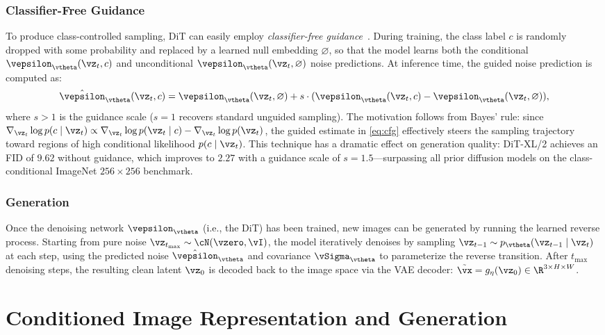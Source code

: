 \documentclass[../../book-main.tex]{subfiles}
\begin{document}
\subsubsection{Classifier-Free Guidance}
To produce class-controlled sampling, DiT can easily employ \textit{classifier-free guidance}~\citep{ho2022classifier}.
During training, the class label \(c\) is randomly dropped with some probability and replaced by a learned null embedding \(\varnothing\), so that the model learns both the conditional \(\vepsilon_{\vtheta}(\vz_t, c)\) and unconditional \(\vepsilon_{\vtheta}(\vz_t, \varnothing)\) noise predictions.
At inference time, the guided noise prediction is computed as:
\begin{equation}
    \hat{\vepsilon}_{\vtheta}(\vz_t, c) = \vepsilon_{\vtheta}(\vz_t, \varnothing) + s \cdot (\vepsilon_{\vtheta}(\vz_t, c) - \vepsilon_{\vtheta}(\vz_t, \varnothing)) ,
    \label{eq:cfg}
\end{equation}
where \(s > 1\) is the guidance scale (\(s = 1\) recovers standard unguided sampling).
The motivation follows from Bayes' rule: since \(\nabla_{\vz_t} \log p(c \mid \vz_t) \propto \nabla_{\vz_t} \log p(\vz_t \mid c) - \nabla_{\vz_t} \log p(\vz_t)\), the guided estimate in \eqref{eq:cfg} effectively steers the sampling trajectory toward regions of high conditional likelihood \(p(c \mid \vz_t)\).
This technique has a dramatic effect on generation quality: DiT-XL/2 achieves an FID of \(9.62\) without guidance, which improves to \(2.27\) with a guidance scale of \(s = 1.5\)---surpassing all prior diffusion models on the class-conditional ImageNet \(256 \times 256\) benchmark.

\subsubsection{Generation}
Once the denoising network \(\vepsilon_{\vtheta}\) (i.e., the DiT) has been trained, new images can be generated by running the learned reverse process.
Starting from pure noise \(\vz_{t_{\max}} \sim \cN(\vzero, \vI)\), the model iteratively denoises by sampling \(\vz_{t-1} \sim p_{\vtheta}(\vz_{t-1} \mid \vz_t)\) at each step, using the predicted noise \(\hat{\vepsilon}_{\vtheta}\) and covariance \(\vSigma_{\vtheta}\) to parameterize the reverse transition.
After \(t_{\max}\) denoising steps, the resulting clean latent \(\vz_0\) is decoded back to the image space via the VAE decoder: \(\tilde{\vx} = g_{\eta}(\vz_0) \in \R^{3 \times H \times W}\).

\section{Conditioned Image Representation and Generation}
\label{sec:cond_gen}
\end{document}
